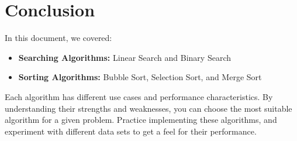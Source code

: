 \documentclass[a4paper,12pt]{article}
\begin{document}
\section{Conclusion}
In this document, we covered:
\begin{itemize}
    \item \textbf{Searching Algorithms:} Linear Search and Binary Search
    \item \textbf{Sorting Algorithms:} Bubble Sort, Selection Sort, and Merge Sort
\end{itemize}

Each algorithm has different use cases and performance characteristics. By understanding their strengths and weaknesses, you can choose the most suitable algorithm for a given problem. Practice implementing these algorithms, and experiment with different data sets to get a feel for their performance.
\end{document}
